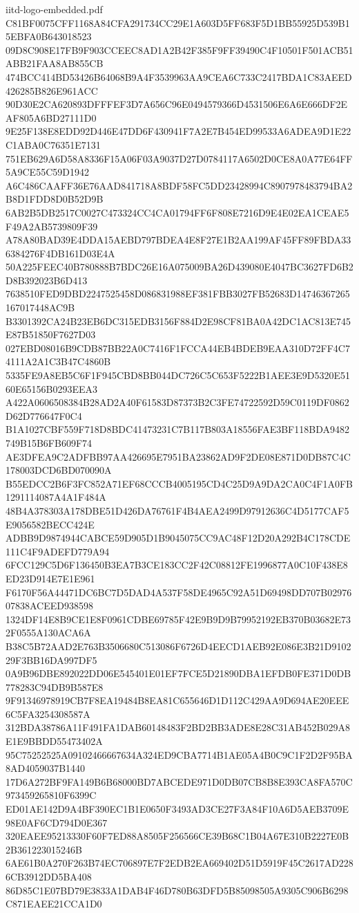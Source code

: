 \begin{filecontents*}[overwrite]{iitd-logo-embedded.pdf}
C81BF0075CFF1168A84CFA291734CC29E1A603D5FF683F5D1BB55925D539B15EBFA0B643018523
09D8C908E17FB9F903CCEEC8AD1A2B42F385F9FF39490C4F10501F501ACB51ABB21FAA8AB855CB
474BCC414BD53426B64068B9A4F3539963AA9CEA6C733C2417BDA1C83AEED426285B826E961ACC
90D30E2CA620893DFFFEF3D7A656C96E0494579366D4531506E6A6E666DF2EAF805A6BD27111D0
9E25F138E8EDD92D446E47DD6F430941F7A2E7B454ED99533A6ADEA9D1E22C1ABA0C76351E7131
751EB629A6D58A8336F15A06F03A9037D27D0784117A6502D0CE8A0A77E64FF5A9CE55C59D1942
A6C486CAAFF36E76AAD841718A8BDF58FC5DD23428994C8907978483794BA2B8D1FDD8D0B52D9B
6AB2B5DB2517C0027C473324CC4CA01794FF6F808E7216D9E4E02EA1CEAE5F49A2AB5739809F39
A78A80BAD39E4DDA15AEBD797BDEA4E8F27E1B2AA199AF45FF89FBDA336384276F4DB161D03E4A
50A225FEEC40B780888B7BDC26E16A075009BA26D439080E4047BC3627FD6B2D8B392023B6D413
7638510FED9DBD2247525458D086831988EF381FBB3027FB52683D14746367265167017448AC9B
B3301392CA24B23EB6DC315EDB3156F884D2E98CF81BA0A42DC1AC813E745E87B51850F7627D03
027EBD08016B9CDB87BB22A0C7416F1FCCA44EB4BDEB9EAA310D72FF4C74111A2A1C3B47C4860B
5335FE9A8EB5C6F1F945CBD8BB044DC726C5C653F5222B1AEE3E9D5320E5160E65156B0293EEA3
A422A0606508384B28AD2A40F61583D87373B2C3FE74722592D59C0119DF0862D62D776647F0C4
B1A1027CBF559F718D8BDC41473231C7B117B803A18556FAE3BF118BDA9482749B15B6FB609F74
AE3DFEA9C2ADFBB97AA426695E7951BA23862AD9F2DE08E871D0DB87C4C178003DCD6BD070090A
B55EDCC2B6F3FC852A71EF68CCCB4005195CD4C25D9A9DA2CA0C4F1A0FB1291114087A4A1F484A
48B4A378303A178DBE51D426DA76761F4B4AEA2499D97912636C4D5177CAF5E9056582BECC424E
ADBB9D9874944CABCE59D905D1B9045075CC9AC48F12D20A292B4C178CDE111C4F9ADEFD779A94
6FCC129C5D6F136450B3EA7B3CE183CC2F42C08812FE1996877A0C10F438E8ED23D914E7E1E961
F6170F56A44471DC6BC7D5DAD4A537F58DE4965C92A51D69498DD707B0297607838ACEED938598
1324DF14E8B9CE1E8F0961CDBE69785F42E9B9D9B79952192EB370B03682E732F0555A130ACA6A
B38C5B72AAD2E763B3506680C513086F6726D4EECD1AEB92E086E3B21D910229F3BB16DA997DF5
0A9B96DBE892022DD06E545401E01EF7FCE5D21890DBA1EFDB0FE371D0DB778283C94DB9B587E8
9F91346978919CB7F8EA19484B8EA81C655646D1D112C429AA9D694AE20EEE6C5FA3254308587A
312BDA38786A11F491FA1DAB60148483F2BD2BB3ADE8E28C31AB452B029A8E1E9BBDD55473402A
95C75252525A09102466667634A324ED9CBA7714B1AE05A4B0C9C1F2D2F95BA8AD4059037B1440
17D6A272BF9FA149B6B68000BD7ABCEDE971D0DB07CB8B8E393CA8FA570C973459265810F6399C
ED01AE142D9A4BF390EC1B1E0650F3493AD3CE27F3A84F10A6D5AEB3709E98E0AF6CD794D0E367
320EAEE95213330F60F7ED88A8505F256566CE39B68C1B04A67E310B2227E0B2B361223015246B
6AE61B0A270F263B74EC706897E7F2EDB2EA669402D51D5919F45C2617AD2286CB3912DD5BA408
86D85C1E07BD79E3833A1DAB4F46D780B63DFD5B85098505A9305C906B6298C871EAEE21CCA1D0

\end{filecontents*}
